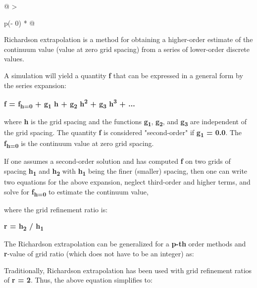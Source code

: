 \begin{longtable}[]{@{}
  >{\raggedright\arraybackslash}p{(\columnwidth - 0\tabcolsep) * }@{}}
\begin{minipage}[t]{\linewidth}
Richardson extrapolation is a method for obtaining a higher-order
estimate of the continuum value (value at zero grid spacing) from a
series of lower-order discrete values.

A simulation will yield a quantity \textbf{f} that can be expressed in a
general form by the series expansion:

\textbf{f = f\textsubscript{h=0} + g\textsubscript{1} h +
g\textsubscript{2} h\textsuperscript{2} + g\textsubscript{3}
h\textsuperscript{3} + ...}

where \textbf{h} is the grid spacing and the functions
\textbf{g\textsubscript{1}}, \textbf{g\textsubscript{2}}, and
\textbf{g\textsubscript{3}} are independent of the grid spacing. The
quantity \textbf{f} is considered "second-order" if
\textbf{g\textsubscript{1} = 0.0}. The \textbf{f\textsubscript{h=0}} is
the continuum value at zero grid spacing.

If one assumes a second-order solution and has computed \textbf{f} on
two grids of spacing \textbf{h\textsubscript{1}} and
\textbf{h\textsubscript{2}} with \textbf{h\textsubscript{1}} being the
finer (smaller) spacing, then one can write two equations for the above
expansion, neglect third-order and higher terms, and solve for
\textbf{f\textsubscript{h=0}} to estimate the continuum value,


where the grid refinement ratio is:

\textbf{r = h\textsubscript{2} / h\textsubscript{1}}

The Richardson extrapolation can be generalized for a \textbf{p-th}
order methods and \textbf{r}-value of grid ratio (which does not have to
be an integer) as:


Traditionally, Richardson extrapolation has been used with grid
refinement ratios of \textbf{r = 2}. Thus, the above equation simplifies
to:



\end{minipage}
\end{longtable}
